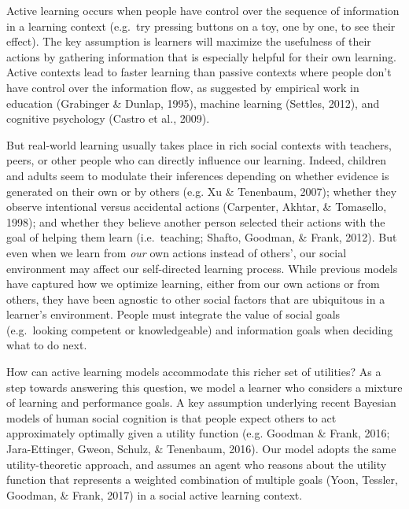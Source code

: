 \documentclass[10pt, letterpaper]{article}
\begin{document}
Active learning occurs when people have control over the sequence of
information in a learning context (e.g.~try pressing buttons on a toy,
one by one, to see their effect). The key assumption is learners will
maximize the usefulness of their actions by gathering information that
is especially helpful for their own learning. Active contexts lead to
faster learning than passive contexts where people don't have control
over the information flow, as suggested by empirical work in education
(Grabinger \& Dunlap, 1995), machine learning (Settles, 2012), and
cognitive psychology (Castro et al., 2009).

But real-world learning usually takes place in rich social contexts with
teachers, peers, or other people who can directly influence our
learning. Indeed, children and adults seem to modulate their inferences
depending on whether evidence is generated on their own or by others
(e.g. Xu \& Tenenbaum, 2007); whether they observe intentional versus
accidental actions (Carpenter, Akhtar, \& Tomasello, 1998); and whether
they believe another person selected their actions with the goal of
helping them learn (i.e.~teaching; Shafto, Goodman, \& Frank, 2012). But
even when we learn from \emph{our} own actions instead of others', our
social environment may affect our self-directed learning process. While
previous models have captured how we optimize learning, either from our
own actions or from others, they have been agnostic to other social
factors that are ubiquitous in a learner's environment. People must
integrate the value of social goals (e.g.~looking competent or
knowledgeable) and information goals when deciding what to do next.

How can active learning models accommodate this richer set of utilities?
As a step towards answering this question, we model a learner who
considers a mixture of learning and performance goals. A key assumption
underlying recent Bayesian models of human social cognition is that
people expect others to act approximately optimally given a utility
function (e.g. Goodman \& Frank, 2016; Jara-Ettinger, Gweon, Schulz, \&
Tenenbaum, 2016). Our model adopts the same utility-theoretic approach,
and assumes an agent who reasons about the utility function that
represents a weighted combination of multiple goals (Yoon, Tessler,
Goodman, \& Frank, 2017) in a social active learning context.
\end{document}
